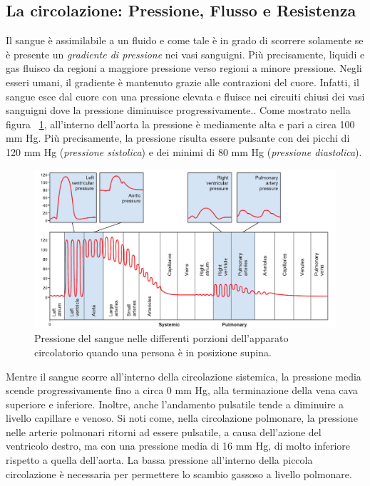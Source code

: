\subsection{La circolazione: Pressione, Flusso e Resistenza}
Il sangue è assimilabile a un fluido e come tale è in grado di scorrere solamente se è presente un \textit{gradiente di pressione} nei vasi sanguigni. Più precisamente, liquidi e gas fluisco da regioni a maggiore pressione verso regioni a minore pressione. Negli esseri umani, il gradiente è mantenuto grazie alle contrazioni del cuore. Infatti, il sangue esce dal cuore con una pressione elevata e fluisce nei circuiti chiusi dei vasi sanguigni dove la pressione diminuisce progressivamente.\cite{SilverthornDeeUnglaub2020Fu:u}.
Come mostrato nella figura \Fig~\ref{fig:PressioneSangue}, all'interno dell'aorta la pressione è mediamente alta e pari a circa 100 mm Hg. Più precisamente, la pressione risulta essere pulsante con dei picchi di 120 mm Hg (\textit{pressione sistolica}) e dei minimi di 80 mm Hg (\textit{pressione diastolica}).
\begin{figure}[h]
 	\centering
 	\includegraphics[width=0.9\linewidth]{ImageFiles/Fotopletismografia/PressioneSangue}
 	\caption{Pressione del sangue nelle differenti porzioni dell'apparato circolatorio quando una persona è in posizione supina.}
 	\label{fig:PressioneSangue}
\end{figure}
Mentre il sangue scorre all'interno della circolazione sistemica, la pressione media scende progressivamente fino a circa 0 mm Hg, alla terminazione della vena cava superiore e inferiore. Inoltre, anche l'andamento pulsatile tende a diminuire a livello capillare e venoso. Si noti come, nella circolazione polmonare, la pressione nelle arterie polmonari ritorni ad essere pulsatile, a causa dell'azione del ventricolo destro, ma con una pressione media di 16 mm Hg, di molto inferiore rispetto a quella dell'aorta. La bassa pressione all'interno della piccola circolazione è necessaria per permettere lo scambio gassoso a livello polmonare.

